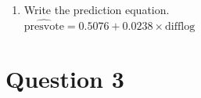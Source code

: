 \documentclass[12pt,letterpaper]{article}
\begin{document}
\begin{enumerate}
		R: 
		
		\begin{verbatim}
		           1            2            3            4            5            6 
		0.005605594  0.037578519 -0.053134788 -0.052993694 -0.045842994  0.074339701 
		\end{verbatim}
		The residuals represent the variation in the presidential voteshare that is unexplained by the difflog (we remove the effect of difflog from the voteshare variable).
		\vspace{.5cm}
		\item Write the prediction equation.\\
		
		$\widehat{\text{presvote}} = 0.5076 + 0.0238 \times \text{difflog}$
	\end{enumerate}
	
	\vspace{.5cm}
\section*{Question 3}
\end{document}

